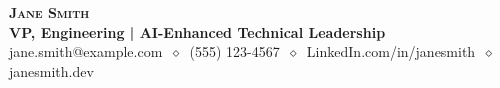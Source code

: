 
\begin{center}
  \textbf{\LARGE\scshape Jane Smith} \\
  \vspace{8pt}
  \textbf{VP, Engineering | AI-Enhanced Technical Leadership} \\
  \vspace{1pt}\small
  jane.smith@example.com
  $\ \diamond\ $ 
  (555) 123-4567
  $\ \diamond\ $
  LinkedIn.com/in/janesmith
  $\ \diamond\ $
  janesmith.dev
\end{center}